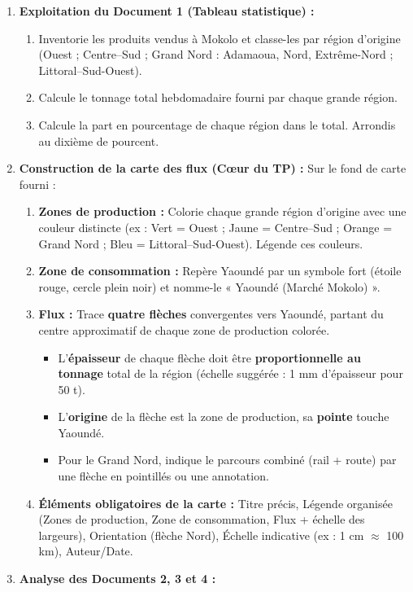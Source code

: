 \documentclass[11pt]{article}
\begin{document}
\begin{enumerate}
\item \textbf{Exploitation du Document 1 (Tableau statistique) :}
\begin{enumerate}
\item Inventorie les produits vendus à Mokolo et classe-les par région d'origine (Ouest ; Centre--Sud ; Grand Nord : Adamaoua, Nord, Extrême-Nord ; Littoral--Sud-Ouest).
\item Calcule le tonnage total hebdomadaire fourni par chaque grande région.
\item Calcule la part en pourcentage de chaque région dans le total. Arrondis au dixième de pourcent.
\end{enumerate}
\item \textbf{Construction de la carte des flux (Cœur du TP) :}
Sur le fond de carte fourni :
\begin{enumerate}
\item \textbf{Zones de production :} Colorie chaque grande région d'origine avec une couleur distincte (ex : Vert = Ouest ; Jaune = Centre--Sud ; Orange = Grand Nord ; Bleu = Littoral--Sud-Ouest). Légende ces couleurs.
\item \textbf{Zone de consommation :} Repère Yaoundé par un symbole fort (étoile rouge, cercle plein noir) et nomme-le « Yaoundé (Marché Mokolo) ».
\item \textbf{Flux :} Trace \textbf{quatre flèches} convergentes vers Yaoundé, partant du centre approximatif de chaque zone de production colorée.
\begin{itemize}
\item L'\textbf{épaisseur} de chaque flèche doit être \textbf{proportionnelle au tonnage} total de la région (échelle suggérée : 1 mm d'épaisseur pour 50 t).
\item L'\textbf{origine} de la flèche est la zone de production, sa \textbf{pointe} touche Yaoundé.
\item Pour le Grand Nord, indique le parcours combiné (rail + route) par une flèche en pointillés ou une annotation.
\end{itemize}
\item \textbf{Éléments obligatoires de la carte :} Titre précis, Légende organisée (Zones de production, Zone de consommation, Flux + échelle des largeurs), Orientation (flèche Nord), Échelle indicative (ex : 1 cm $\approx$ 100 km), Auteur/Date.
\end{enumerate}
\item \textbf{Analyse des Documents 2, 3 et 4 :}

\end{enumerate}
\end{document}
